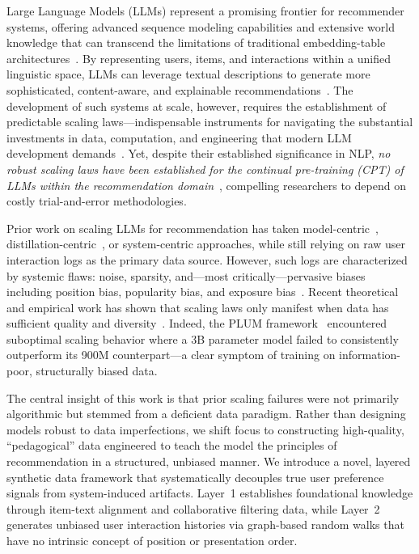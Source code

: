 \documentclass[]{fairmeta}
\begin{document}
Large Language Models (LLMs) represent a promising frontier for recommender systems, offering advanced sequence modeling capabilities and extensive world knowledge that can transcend the limitations of traditional embedding-table architectures~\cite{kangSelfAttentiveSequentialRecommendation2018, zhaiActionsSpeakLouder2024}. By representing users, items, and interactions within a unified linguistic space, LLMs can leverage textual descriptions to generate more sophisticated, content-aware, and explainable recommendations~\cite{rajputRecommenderSystemsGenerative2023, chenHLLMEnhancingSequential2024, hePLUMAdaptingPretrained2025}. The development of such systems at scale, however, requires the establishment of predictable scaling laws---indispensable instruments for navigating the substantial investments in data, computation, and engineering that modern LLM development demands~\cite{hoffmann2022training}. Yet, despite their established significance in NLP, \emph{no robust scaling laws
  have been established for the continual pre-training (CPT) of LLMs within the recommendation domain}~\cite{zhouOneRecTechnicalReport2025, hePLUMAdaptingPretrained2025}, compelling researchers to depend on costly trial-and-error methodologies.

  Prior work on scaling LLMs for recommendation has taken model-centric~\cite{yan2025unlockingscalinglawindustrial}, distillation-centric~\cite{Lai_2025}, or system-centric approaches, while still relying on raw user interaction logs as the primary data source. However, such logs are characterized by systemic flaws: noise, sparsity, and---most critically---pervasive biases including position bias, popularity bias, and exposure bias~\cite{chen2021biasdebiasrecommendersystem, NEURIPS2023_eb3c42dd}. Recent theoretical and empirical work has shown that scaling laws only manifest when data has sufficient quality and diversity~\cite{yang2024syntheticcontinuedpretraining, allenzhu2024physicslanguagemodels31}. Indeed, the PLUM framework~\cite{hePLUMAdaptingPretrained2025} encountered suboptimal scaling behavior where a 3B parameter model failed to consistently outperform its 900M counterpart---a clear symptom of training on information-poor, structurally biased data.

  The central insight of this work is that prior scaling failures were not primarily algorithmic but stemmed from a deficient data paradigm. Rather than designing models robust to data imperfections, we shift focus to constructing high-quality, ``pedagogical'' data engineered to teach the model the principles of recommendation in a structured, unbiased manner. We introduce a novel, layered synthetic data framework that systematically decouples true user preference signals from system-induced artifacts. Layer~1 establishes foundational knowledge through item-text alignment and collaborative filtering data, while Layer~2 generates unbiased user interaction histories via graph-based random walks that have no intrinsic concept of position or presentation order.
\end{document}

